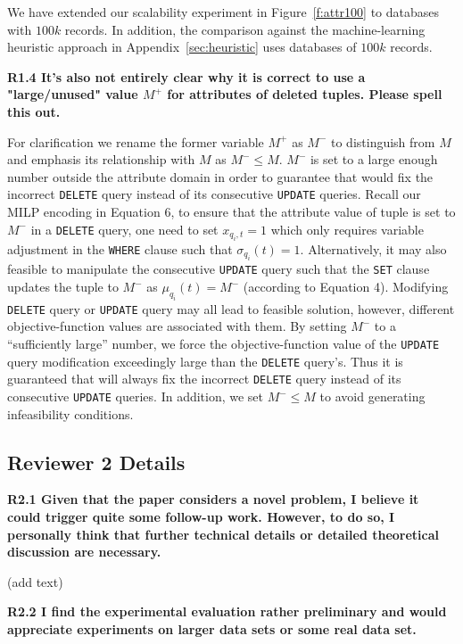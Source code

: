 We have extended our scalability experiment in Figure~\ref{f:attr100} to databases with $100k$ records. In addition, the comparison against the machine-learning heuristic approach in Appendix~\ref{sec:heuristic} uses databases of $100k$ records.

\noindent \textbf{R1.4 It's also not entirely clear why it is correct to use a "large/unused" value $M^+$ for attributes of deleted tuples. Please spell this out.}

For clarification we rename the former variable $M^+$ as $M^-$ to distinguish from $M$ and emphasis its relationship with $M$ as $M^- \leq M$. 
$M^-$ is set to a large enough number outside the attribute domain in order to guarantee that \sys would fix the incorrect \texttt{DELETE} query instead of its consecutive \texttt{UPDATE} queries. Recall our MILP encoding in Equation 6, to ensure that the attribute value of tuple is set to $M^-$ in a \texttt{DELETE} query, one need to set $x_{q_i,t} = 1$ which only requires variable adjustment in the \texttt{WHERE} clause such that $\sigma_{q_i}(t) = 1$. Alternatively, it may also feasible to manipulate the consecutive \texttt{UPDATE} query such that the \texttt{SET} clause updates the tuple to $M^-$ as $\mu_{q_i}(t) = M^-$ (according to Equation 4). Modifying \texttt{DELETE} query or \texttt{UPDATE} query may all lead to feasible solution, however, different objective-function values are associated with them. By setting $M^-$ to a ``sufficiently large'' number, we force the objective-function value of the \texttt{UPDATE} query modification exceedingly large than the \texttt{DELETE} query's. Thus it is  guaranteed that \sys will always fix the incorrect \texttt{DELETE} query instead of its consecutive \texttt{UPDATE} queries. In addition, we set $M^- \leq M$ to avoid generating infeasibility conditions.

\subsection*{Reviewer 2 Details} 

\noindent \textbf{R2.1 Given that the paper considers a novel problem, I believe it could trigger quite some follow-up work. However, to do so, I personally think that further technical details or detailed theoretical discussion are necessary. }

(add text)

\noindent \textbf{R2.2 I find the experimental evaluation rather preliminary and would appreciate experiments on larger data sets or some real data set.}


